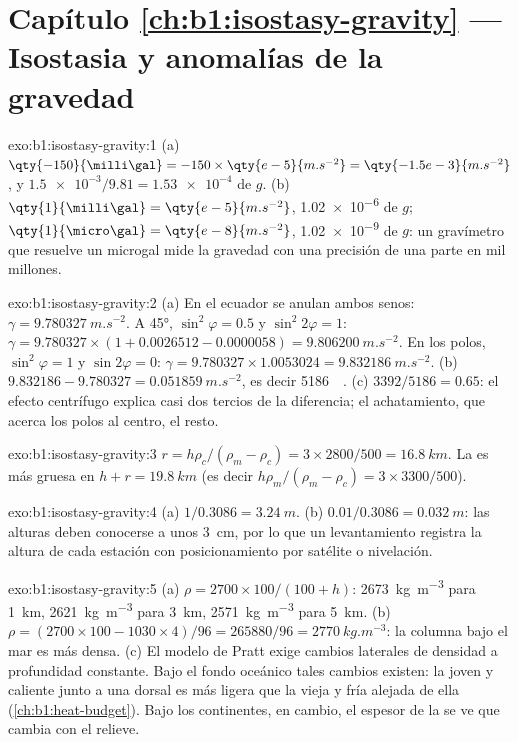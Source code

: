 \section*{Capítulo \ref{ch:b1:isostasy-gravity} --- Isostasia y anomalías de la gravedad}

\begin{solution}{exo:b1:isostasy-gravity:1}
(a) $\qty{-150}{\milli\gal} = -150\times\qty{e-5}{m.s^{-2}} = \qty{-1.5e-3}{m.s^{-2}}$,
y $\num{1.5e-3}/9.81 = \num{1.53e-4}$ de $g$. (b) $\qty{1}{\milli\gal} =
\qty{e-5}{m.s^{-2}}$, \num{1.02e-6} de $g$; $\qty{1}{\micro\gal} =
\qty{e-8}{m.s^{-2}}$, \num{1.02e-9} de $g$: un gravímetro que resuelve un microgal mide la gravedad con una precisión de una parte en mil millones.
\end{solution}

\begin{solution}{exo:b1:isostasy-gravity:2}
(a) En el ecuador se anulan ambos senos: $\gamma = \qty{9.780327}{m.s^{-2}}$. A
\ang{45}, $\sin^2\varphi = 0.5$ y $\sin^2 2\varphi = 1$:
$\gamma = 9.780327\times(1 + 0.0026512 - 0.0000058) = \qty{9.806200}{m.s^{-2}}$.
En los polos, $\sin^2\varphi = 1$ y $\sin 2\varphi = 0$:
$\gamma = 9.780327\times1.0053024 = \qty{9.832186}{m.s^{-2}}$.
(b) $9.832186 - 9.780327 = \qty{0.051859}{m.s^{-2}}$, es decir
\qty{5186}{\milli\gal}. (c) $3392/5186 = 0.65$: el efecto centrífugo explica
casi dos tercios de la diferencia; el achatamiento, que acerca los polos al
centro, el resto.
\end{solution}

\begin{solution}{exo:b1:isostasy-gravity:3}
$r = h\rho_c/(\rho_m - \rho_c) = 3\times2800/500 = \qty{16.8}{km}$. La  es
más gruesa en $h + r = \qty{19.8}{km}$ (es decir $h\rho_m/(\rho_m - \rho_c) =
3\times3300/500$).
\end{solution}

\begin{solution}{exo:b1:isostasy-gravity:4}
(a) $1/0.3086 = \qty{3.24}{m}$. (b) $0.01/0.3086 = \qty{0.032}{m}$: las alturas
deben conocerse a unos \qty{3}{cm}, por lo que un levantamiento registra la altura de cada estación con posicionamiento por satélite o nivelación.
\end{solution}

\begin{solution}{exo:b1:isostasy-gravity:5}
(a) $\rho = 2700\times100/(100 + h)$: \qty{2673}{kg.m^{-3}} para \qty{1}{km},
\qty{2621}{kg.m^{-3}} para \qty{3}{km}, \qty{2571}{kg.m^{-3}} para \qty{5}{km}.
(b) $\rho = (2700\times100 - 1030\times4)/96 = \num{265880}/96 =
\qty{2770}{kg.m^{-3}}$: la columna bajo el mar es más densa. (c) El modelo de Pratt
exige cambios laterales de densidad a profundidad constante. Bajo el fondo oceánico
tales cambios existen: la  joven y caliente junto a una dorsal es más ligera que la
 vieja y fría alejada de ella (\cref{ch:b1:heat-budget}). Bajo los continentes,
en cambio, el espesor de la  se ve que cambia con el relieve.
\end{solution}

